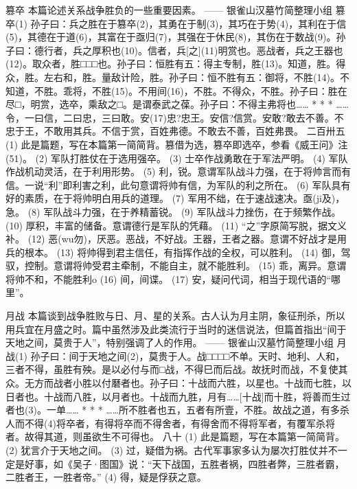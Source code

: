 \documentclass[12pt,UTF8]{ctexbook}
\begin{document}
篡卒
本篇论述关系战争胜负的一些重要因素。
—— 银雀山汉墓竹简整理小组
篡卒(1)
孙子曰：兵之胜在于篡卒(2)，其勇在于制(3)，其巧在于势(4)，其利在于信(5)，其德在于道(6)，其富在于亟归(7)，其强在于休民(8)，其伤在于数战(9)。孙子曰：德行者，兵之厚积也(10)。信者，兵[之](11)明赏也。恶战者，兵之王器也(12)。取众者，胜□□□也。孙子曰：恒胜有五：得主专制，胜(13)。知道，胜。得众，胜。左右和，胜。量敌计险，胜。孙子曰：恒不胜有五：御将，不胜(14)。不知道，不胜。乖将，不胜(15)。不用间(16)，不胜。不得众，不胜。孙子曰：胜在尽□，明赏，选卒，乘敌之□。是谓泰武之葆。孙子曰：不得主弗将也……
* * *
……令，一曰信，二曰忠，三曰敢。安(17)忠?忠王。安信?信赏。安敢?敢去不善。不忠于王，不敢用其兵。不信于赏，百姓弗德。不敢去不善，百姓弗畏。
二百卅五
(1) 此是篇题，写在本篇第一简简背。篡借为选，篡卒即选卒，参看《威王问》注(51)。
(2) 军队打胜仗在于选用强卒。
(3) 士卒作战勇敢在于军法严明。
(4) 军队作战机动灵活，在于利用形势。
(5) 利，锐。意谓军队战斗力强，在于将帅言而有信。一说“利”即利害之利，此句意谓将帅有信，为军队的利之所在。
(6) 军队具有好的素质，在于将帅明白用兵的道理。
(7) 军用不绌，在于速战速决。亟(ji及)，急。
(8) 军队战斗力强，在于养精蓄锐。
(9) 军队战斗力挫伤，在于频繁作战。
(10) 厚积，丰富的储备。意谓德行是军队的凭藉。
(11) “之”字原简写脱，据文义补。
(12) 恶(wu勿)，厌恶。恶战，不好战。王器，王者之器。意谓不好战才是用兵的根本。
(13) 将帅得到君主信任，有指挥作战的全权，可以胜利。
(14) 御，驾驭，控制。意谓将帅受君主牵制，不能自主，就不能胜利。
(15) 乖，离异。意谓将帅不和，不能胜利o
(16) 间，间谍。
(17) 安，疑问代词，相当于现代语的“哪里”。

月战
本篇谈到战争胜败与日、月、星的关系。古人认为月主阴，象征刑杀，所以用兵宜在月盛之时。篇中虽然涉及此类流行于当时的迷信说法，但篇首指出“间于天地之间，莫贵于人”，特别强调了人的作用。
—— 银雀山汉墓竹简整理小组
月战(1)
孙子曰：间于天地之间(2)，莫贵于人。战□□□□不单。天时、地利、人和，三者不得，虽胜有殃。是以必付与而□战，不得巳而后战。故抚时而战，不复使其众。无方而战者小胜以付磿者也。孙子曰：十战而六胜，以星也。十战而七胜，以日者也。十战而八胜，以月者也。十战而九胜，月有……[十战]而十胜，将善而生过者也(3)。一单……
* * *
……所不胜者也五，五者有所壹，不胜。故战之道，有多杀人而不得(4)将卒者，有得将卒而不得舍者，有得舍而不得将军者，有覆军杀将者。故得其道，则虽欲生不可得也。
八十
(1) 此是篇题，写在本篇第一简简背。
(2) 犹言介于天地之间。
(3) 过，疑借为祸。古代军事家多认为屡次打胜仗并不一定是好事，如《吴子·图国》说：“天下战国，五胜者祸，四胜者弊，三胜者霸，二胜者王，一胜者帝。”
(4) 得，疑是俘获之意。
\end{document}
